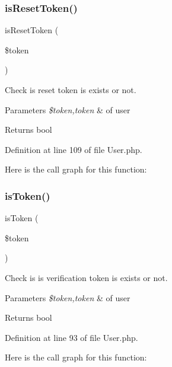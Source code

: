 \subsubsection{\texorpdfstring{is\+Reset\+Token()}{isResetToken()}}
{\footnotesize\ttfamily is\+Reset\+Token (\begin{DoxyParamCaption}\item[{}]{\$token }\end{DoxyParamCaption})}

Check is reset token is exists or not.


\begin{DoxyParams}{Parameters}
{\em \$token,token} & of user\\
\hline
\end{DoxyParams}
\begin{DoxyReturn}{Returns}
bool 
\end{DoxyReturn}


Definition at line 109 of file User.\+php.

Here is the call graph for this function\+:
\mbox{\label{class_zest_1_1_auth_1_1_user_a30f35759659d9838b8eaffb96d7a5d2a}} 
\subsubsection{\texorpdfstring{is\+Token()}{isToken()}}
{\footnotesize\ttfamily is\+Token (\begin{DoxyParamCaption}\item[{}]{\$token }\end{DoxyParamCaption})}

Check is is verification token is exists or not.


\begin{DoxyParams}{Parameters}
{\em \$token,token} & of user\\
\hline
\end{DoxyParams}
\begin{DoxyReturn}{Returns}
bool 
\end{DoxyReturn}


Definition at line 93 of file User.\+php.

Here is the call graph for this function\+:
\mbox{\label{class_zest_1_1_auth_1_1_user_a99ae17e029c338ef8559c3d2c64b94cd}} 
